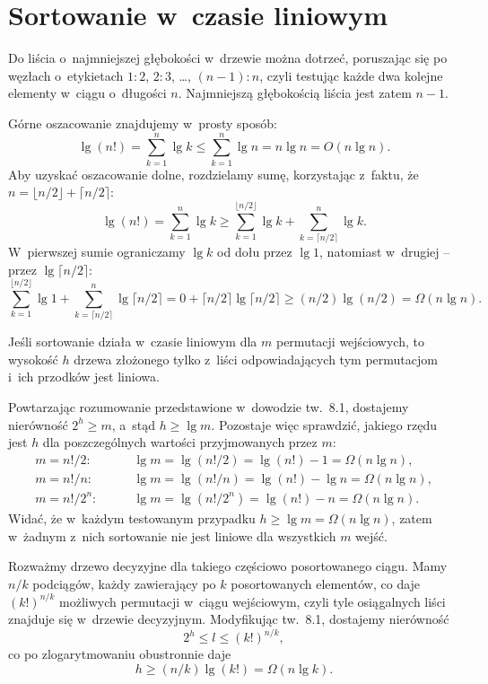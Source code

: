 \chapter{Sortowanie w~czasie liniowym}


\exercise %
Do liścia o~najmniejszej głębokości w~drzewie można dotrzeć, poruszając się po węzłach o~etykietach $1:2$, $2:3$, \dots, $(n-1):n$, czyli testując każde dwa kolejne elementy w~ciągu o~długości $n$. Najmniejszą głębokością liścia jest zatem $n-1$.

\exercise %
Górne oszacowanie znajdujemy w~prosty sposób:
\[
	\lg(n!) = \sum_{k=1}^n\lg k \le \sum_{k=1}^n\lg n = n\lg n = O(n\lg n).
\]
Aby uzyskać oszacowanie dolne, rozdzielamy sumę, korzystając z~faktu, że $n=\lfloor n/2\rfloor+\lceil n/2\rceil$:
\[
	\lg(n!) = \sum_{k=1}^n\lg k \ge \sum_{k=1}^{\lfloor n/2\rfloor}\lg k+\sum_{k=\lceil n/2\rceil}^n\lg k.
\]
W~pierwszej sumie ograniczamy $\lg k$ od dołu przez $\lg1$, natomiast w~drugiej -- przez $\lg\lceil n/2\rceil$:
\[
	\sum_{k=1}^{\lfloor n/2\rfloor}\lg1+\sum_{k=\lceil n/2\rceil}^n\lg\lceil n/2\rceil = 0+\lceil n/2\rceil\lg\lceil n/2\rceil \ge (n/2)\lg(n/2) = \Omega(n\lg n).
\]

\exercise %
Jeśli sortowanie działa w~czasie liniowym dla $m$ permutacji wejściowych, to wysokość $h$ drzewa złożonego tylko z~liści odpowiadających tym permutacjom i~ich przodków jest liniowa.

Powtarzając rozumowanie przedstawione w~dowodzie tw.~8.1, dostajemy nierówność $2^h\ge m$, a~stąd $h\ge\lg m$. Pozostaje więc sprawdzić, jakiego rzędu jest $h$ dla poszczególnych wartości przyjmowanych przez $m$:
\begin{align*}
	m = n!/2: &\qquad \lg m = \lg(n!/2) = \lg(n!)-1 = \Omega(n\lg n), \\
	m = n!/n: &\qquad \lg m = \lg(n!/n) = \lg(n!)-\lg n = \Omega(n\lg n), \\
	m = n!/2^n: &\qquad \lg m = \lg(n!/2^n) = \lg(n!)-n = \Omega(n\lg n).
\end{align*}
Widać, że w~każdym testowanym przypadku $h\ge\lg m=\Omega(n\lg n)$, zatem w~żadnym z~nich sortowanie nie jest liniowe dla wszystkich $m$ wejść.

\exercise %
Rozważmy drzewo decyzyjne dla takiego częściowo posortowanego ciągu. Mamy $n/k$ podciągów, każdy zawierający po $k$ posortowanych elementów, co daje $(k!)^{n/k}$ możliwych permutacji w~ciągu wejściowym, czyli tyle osiągalnych liści znajduje się w~drzewie decyzyjnym. Modyfikując tw.~8.1, dostajemy nierówność
\[
	2^h \le l \le (k!)^{n/k},
\]
co po zlogarytmowaniu obustronnie daje
\[
	h \ge (n/k)\lg(k!) = \Omega(n\lg k).
\]


